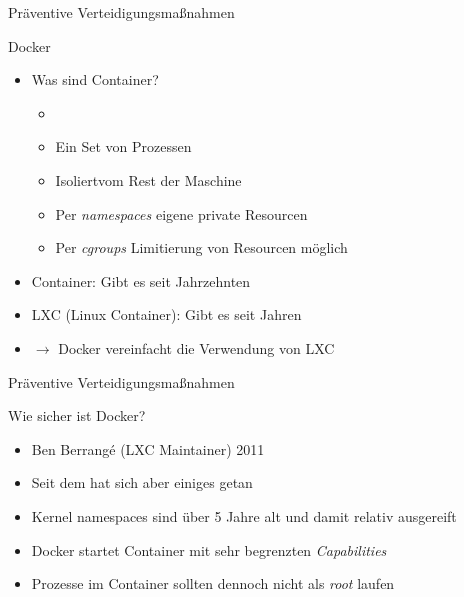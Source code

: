 \begin{frame}{Präventive Verteidigungsmaßnahmen}
  \begin{block}{Docker}
    \begin{itemize}[<+->]
      \item Was sind Container?
      \begin{itemize}[<+->]
        \item \textbf{}\footnotemark
        \item Ein Set von Prozessen
        \item Isoliert\footnotemark vom Rest der Maschine
        \item Per \textit{namespaces} eigene private Resourcen
        \item Per \textit{cgroups} Limitierung von Resourcen möglich
      \end{itemize}
      \item Container: Gibt es seit Jahrzehnten
      \item LXC (Linux Container): Gibt es seit Jahren
      \item $\rightarrow$ Docker vereinfacht die Verwendung von LXC
    \end{itemize}
  \end{block}

\end{frame}

\begin{frame}{Präventive Verteidigungsmaßnahmen}
  \begin{block}{Wie sicher ist Docker?}
    \begin{itemize}[<+->]
      \item {} Ben Berrangé (LXC Maintainer) 2011\footnotemark
      \item Seit dem hat sich aber einiges getan
      \item Kernel namespaces sind über 5 Jahre alt und damit relativ ausgereift
      \item Docker startet Container mit sehr begrenzten \textit{Capabilities}
      \item Prozesse im Container sollten dennoch nicht als \textit{root} laufen
    \end{itemize}
  \end{block}

\end{frame}

